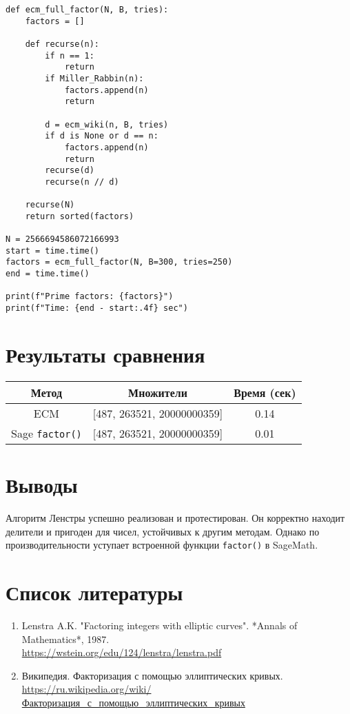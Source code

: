 \documentclass[12pt,a4paper]{article}
\begin{document}
\begin{lstlisting}
def ecm_full_factor(N, B, tries):
    factors = []

    def recurse(n):
        if n == 1:
            return
        if Miller_Rabbin(n):
            factors.append(n)
            return

        d = ecm_wiki(n, B, tries)
        if d is None or d == n:
            factors.append(n)
            return
        recurse(d)
        recurse(n // d)

    recurse(N)
    return sorted(factors)

N = 2566694586072166993
start = time.time()
factors = ecm_full_factor(N, B=300, tries=250)
end = time.time()

print(f"Prime factors: {factors}")
print(f"Time: {end - start:.4f} sec")
\end{lstlisting}

\section*{Результаты сравнения}
\begin{tabular}{|c|c|c|}
\hline
Метод & Множители & Время (сек) \\
\hline
ECM & [487, 263521, 20000000359] & 0.14 \\
\hline
Sage \texttt{factor()} & [487, 263521, 20000000359] & 0.01 \\
\hline
\end{tabular}

\section*{Выводы}
Алгоритм Ленстры успешно реализован и протестирован. Он корректно находит делители и пригоден для чисел, устойчивых к другим методам. Однако по производительности уступает встроенной функции \texttt{factor()} в SageMath.

\newpage

\section*{Список литературы}

\begin{enumerate}
    \item Lenstra A.K. "Factoring integers with elliptic curves". *Annals of Mathematics*, 1987.\\
    \url{https://wstein.org/edu/124/lenstra/lenstra.pdf}
    \item Википедия. Факторизация с помощью эллиптических кривых.\\
    \url{https://ru.wikipedia.org/wiki/Факторизация_с_помощью_эллиптических_кривых}
\end{enumerate}
\end{document}

